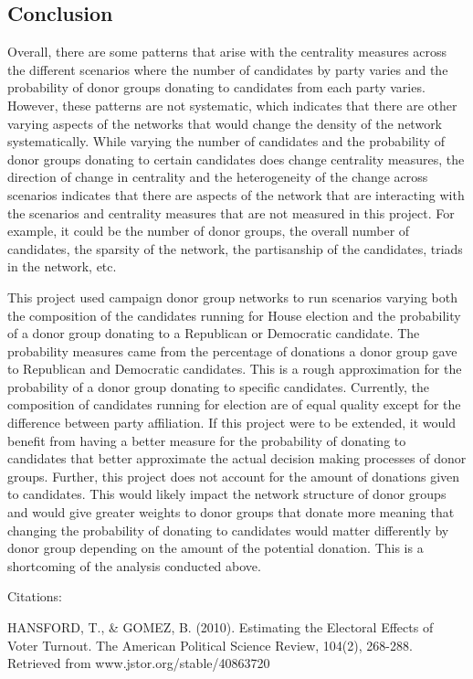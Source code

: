 \documentclass[]{article}
\begin{document}
\subsection{Conclusion}\label{conclusion}

Overall, there are some patterns that arise with the centrality measures
across the different scenarios where the number of candidates by party
varies and the probability of donor groups donating to candidates from
each party varies. However, these patterns are not systematic, which
indicates that there are other varying aspects of the networks that
would change the density of the network systematically. While varying
the number of candidates and the probability of donor groups donating to
certain candidates does change centrality measures, the direction of
change in centrality and the heterogeneity of the change across
scenarios indicates that there are aspects of the network that are
interacting with the scenarios and centrality measures that are not
measured in this project. For example, it could be the number of donor
groups, the overall number of candidates, the sparsity of the network,
the partisanship of the candidates, triads in the network, etc.

This project used campaign donor group networks to run scenarios varying
both the composition of the candidates running for House election and
the probability of a donor group donating to a Republican or Democratic
candidate. The probability measures came from the percentage of
donations a donor group gave to Republican and Democratic candidates.
This is a rough approximation for the probability of a donor group
donating to specific candidates. Currently, the composition of
candidates running for election are of equal quality except for the
difference between party affiliation. If this project were to be
extended, it would benefit from having a better measure for the
probability of donating to candidates that better approximate the actual
decision making processes of donor groups. Further, this project does
not account for the amount of donations given to candidates. This would
likely impact the network structure of donor groups and would give
greater weights to donor groups that donate more meaning that changing
the probability of donating to candidates would matter differently by
donor group depending on the amount of the potential donation. This is a
shortcoming of the analysis conducted above.

Citations:

HANSFORD, T., \& GOMEZ, B. (2010). Estimating the Electoral Effects of
Voter Turnout. The American Political Science Review, 104(2), 268-288.
Retrieved from www.jstor.org/stable/40863720
\end{document}
